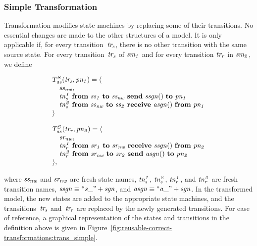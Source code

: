 \subsubsection{Simple Transformation}
Transformation \TSim modifies state machines by replacing some of their transitions.
No essential changes are made to the other structures of a model.
It is only applicable if, for every transition~$\it{tr_s}$, there is no other transition with the same source state.
For every transition~$\it{tr_s}$ of $\it{sm_1}$ and for every transition $\it{tr_r}$ in $\it{sm_2}$, we define

\[
\begin{array}{l}
T^S_{\it{as}}(\it{tr_s}, \it{pn_1}) = \langle \\
\quad \it{ss_{nw}}, \\
\quad \it{tn_s^1}~\textbf{from}~\it{ss_1}~\textbf{to}~\it{ss_{nw}}~\textbf{send}~\it{ssgn}()~\textbf{to}~\it{pn_1} \\
\quad \it{tn_s^2}~\textbf{from}~\it{ss_{nw}}~\textbf{to}~\it{ss_2}~\textbf{receive}~\it{asgn}()~\textbf{from}~\it{pn_1} \\
\rangle
\end{array}
\]

\[
\begin{array}{l}
T^S_{\it{as}}(\it{tr_r}, \it{pn_2}) = \langle \\
\quad \it{sr_{nw}}, \\
\quad \it{tn_r^1}~\textbf{from}~\it{sr_1}~\textbf{to}~\it{sr_{nw}}~\textbf{receive}~\it{ssgn}()~\textbf{from}~\it{pn_2} \\
\quad \it{tn_r^2}~\textbf{from}~\it{sr_{nw}}~\textbf{to}~\it{sr_2}~\textbf{send}~\it{asgn}()~\textbf{to}~\it{pn_2} \\
\rangle,
\end{array}
\]

\noindent
where $\it{ss_{nw}}$ and $\it{sr_{nw}}$ are fresh state names, $\it{tn_s^1}$, $\it{tn_s^2}$, $\it{tn_r^1}$, and $\it{tn_r^2}$ are fresh transition names, $\it{ssgn} \equiv ``s\_"+sgn$, and $\it{asgn} \equiv ``a\_"+sgn$.
In the transformed model, the new states are added to the appropriate state machines, and the transitions~$\it{tr_s}$ and~$\it{tr_r}$ are replaced by the newly generated transitions.
For ease of reference, a graphical representation of the states and transitions in the definition above is given in Figure~\ref{fig:reusable-correct-transformations:trans_simple}.

